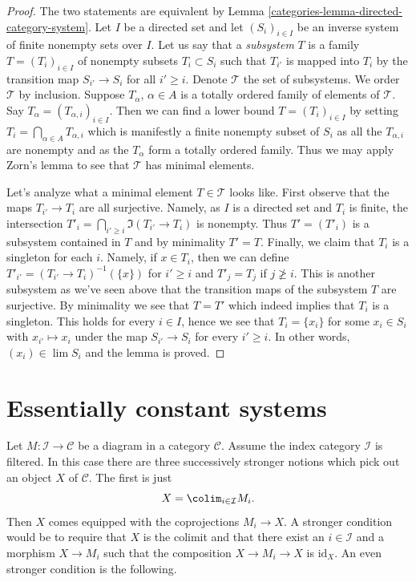 \begin{proof}

The two statements are equivalent by
Lemma \ref{categories-lemma-directed-category-system}.
Let $I$ be a directed set and let $(S_i)_{i \in I}$
be an inverse system of finite nonempty sets over $I$.
Let us say that a {\it subsystem} $T$ is a family $T = (T_i)_{i \in I}$
of nonempty subsets $T_i \subset S_i$ such that $T_{i'}$ is mapped
into $T_i$ by the transition map $S_{i'} \to S_i$ for all $i' \geq i$.
Denote $\mathcal{T}$ the set of subsystems. We order $\mathcal{T}$
by inclusion. Suppose $T_\alpha$, $\alpha \in A$ is a totally ordered family
of elements of $\mathcal{T}$. Say $T_\alpha = (T_{\alpha, i})_{i \in I}$.
Then we can find a lower bound $T = (T_i)_{i \in I}$ by setting
$T_i = \bigcap_{\alpha \in A} T_{\alpha, i}$ which is manifestly a
finite nonempty subset of $S_i$ as all the $T_{\alpha, i}$ are nonempty
and as the $T_\alpha$ form a totally ordered family. Thus we may
apply Zorn's lemma to see that $\mathcal{T}$ has minimal elements.

\medskip\noindent
Let's analyze what a minimal element $T \in \mathcal{T}$ looks like.
First observe that the maps $T_{i'} \to T_i$ are all surjective.
Namely, as $I$ is a directed set and $T_i$ is finite,
the intersection $T'_i = \bigcap_{i' \geq i} \Im(T_{i'} \to T_i)$
is nonempty. Thus $T' = (T'_i)$ is a subsystem contained in $T$ and
by minimality $T' = T$. Finally, we claim that $T_i$ is a singleton
for each $i$. Namely, if $x \in T_i$, then we can define
$T'_{i'} = (T_{i'} \to T_i)^{-1}(\{x\})$ for $i' \geq i$ and
$T'_j = T_j$ if $j \not \geq i$. This is another subsystem as we've seen
above that the transition maps of the subsystem $T$ are surjective.
By minimality we see that $T = T'$ which indeed implies that $T_i$
is a singleton. This holds for every $i \in I$, hence we see that
$T_i = \{x_i\}$ for some $x_i \in S_i$ with $x_{i'} \mapsto x_i$
under the map $S_{i'} \to S_i$ for every $i' \geq i$. In other words,
$(x_i) \in \lim S_i$ and the lemma is proved.
\end{proof}

\section{Essentially constant systems}
\label{categories-section-essentially-constant}
Let $M : \mathcal{I} \to \mathcal{C}$ be a diagram in a category $\mathcal{C}$.
Assume the index category $\mathcal{I}$ is filtered. In this case
there are three successively stronger notions which pick out an object
$X$ of $\mathcal{C}$. The first is just
$$
X = \colim_{i \in \mathcal{I}} M_i.
$$
Then $X$ comes equipped with the coprojections $M_i \to X$.
A stronger condition would be to require that $X$ is the colimit and
that there exist an $i \in \mathcal{I}$ and a morphism $X \to M_i$ such
that the composition $X \to M_i \to X$ is $\text{id}_X$. An even
stronger condition is the following.

